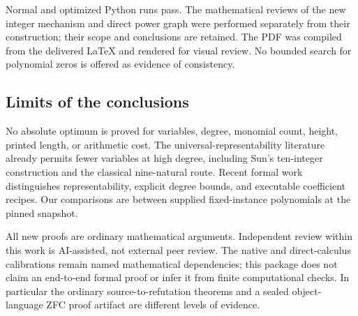 Normal and optimized Python runs pass. The mathematical reviews of the
new integer mechanism and direct power graph were performed separately
from their construction; their scope and conclusions are retained. The
PDF was compiled from the delivered LaTeX and rendered for visual review.
No bounded search for polynomial zeros is offered as evidence of consistency.

\subsection{Limits of the conclusions}
No absolute optimum is proved for variables, degree, monomial count,
height, printed length, or arithmetic cost. The universal-representability
literature already permits fewer variables at high degree, including
Sun's ten-integer construction\cite{sun10} and the classical nine-natural
route. Recent formal work distinguishes representability, explicit degree
bounds, and executable coefficient recipes\cite{bayer}. Our comparisons
are between supplied fixed-instance polynomials at the pinned snapshot.

All new proofs are ordinary mathematical arguments. Independent review
within this work is AI-assisted, not external peer review. The native and
direct-calculus calibrations remain named mathematical dependencies;
this package does not claim an end-to-end formal proof or infer it from
finite computational checks. In particular the ordinary source-to-refutation
theorems and a sealed object-language ZFC proof artifact are different
levels of evidence.

